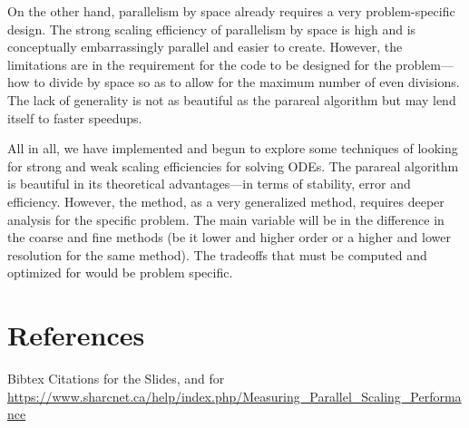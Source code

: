 \documentclass[letterpaper,12pt]{article}
\begin{document}
On the other hand, parallelism by space already requires a very problem-specific
design. The strong scaling efficiency of parallelism by space is high and is
conceptually embarrassingly parallel and easier to create. However, the
limitations are in the requirement for the code to be designed for the
problem---how to divide by space so as to allow for the maximum number of even
divisions. The lack of generality is not as beautiful as the parareal algorithm
but may lend itself to faster speedups.

All in all, we have implemented and begun to explore some techniques of looking
for strong and weak scaling efficiencies for solving ODEs. The parareal
algorithm is beautiful in its theoretical advantages---in terms of stability,
error and efficiency. However, the method, as a very generalized method,
requires deeper analysis for the specific problem. The main variable will be in
the difference in the coarse and fine methods (be it lower and higher order or a
higher and lower resolution for the same method). The tradeoffs that must be
computed and optimized for would be problem specific.

\section{References}

Bibtex Citations for the Slides, and for \url{https://www.sharcnet.ca/help/index.php/Measuring_Parallel_Scaling_Performance}
\end{document}
